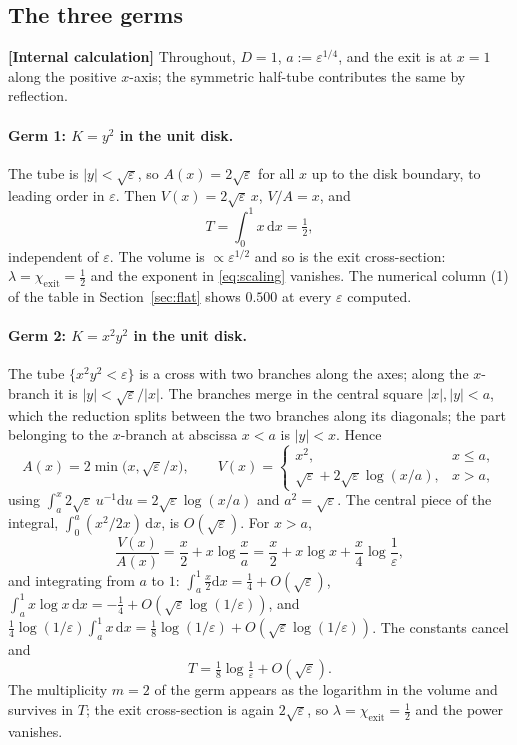 \documentclass[11pt,a4paper]{article}
\newcommand{\eps}{\varepsilon}
\newcommand{\dd}{\mathrm d}
\newcommand{\chiexit}{\chi_{\mathrm{exit}}}
\newcommand{\evl}[2]{{\small\bfseries\color{#1}[#2]}}
\newcommand{\LCalc}{\evl{ccalc}{Internal calculation}}
\begin{document}
\subsection{The three germs}
\label{app:germs}

\LCalc{} Throughout, $D=1$, $a:=\eps^{1/4}$, and the exit is at $x=1$ along
the positive $x$-axis; the symmetric half-tube contributes the same by
reflection.

\paragraph{Germ 1: $K=y^2$ in the unit disk.} The tube is $|y|<\sqrt\eps$,
so $A(x)=2\sqrt\eps$ for all $x$ up to the disk boundary, to leading order
in $\eps$. Then $V(x)=2\sqrt\eps\,x$, $V/A=x$, and
\begin{equation}
T=\int_0^1x\,\dd x=\tfrac12,
\end{equation}
independent of $\eps$. The volume is $\propto\eps^{1/2}$ and so is the exit
cross-section: $\lambda=\chiexit=\tfrac12$ and the exponent in
\eqref{eq:scaling} vanishes. The numerical column (1) of the table in
Section~\ref{sec:flat} shows $0.500$ at every $\eps$ computed.

\paragraph{Germ 2: $K=x^2y^2$ in the unit disk.} The tube
$\{x^2y^2<\eps\}$ is a cross with two branches along the axes; along the
$x$-branch it is $|y|<\sqrt\eps/|x|$. The branches merge in the central
square $|x|,|y|<a$, which the reduction splits between the two branches
along its diagonals; the part belonging to the $x$-branch at abscissa $x<a$
is $|y|<x$. Hence
\begin{equation}
A(x)=2\min\bigl(x,\sqrt\eps/x\bigr),\qquad
V(x)=\begin{cases}x^2,&x\le a,\\[2pt]
\sqrt\eps+2\sqrt\eps\log(x/a),&x>a,\end{cases}
\end{equation}
using $\int_a^x2\sqrt\eps\,u^{-1}\dd u=2\sqrt\eps\log(x/a)$ and
$a^2=\sqrt\eps$. The central piece of the integral, $\int_0^a(x^2/2x)\,\dd x$,
is $O(\sqrt\eps)$. For $x>a$,
\begin{equation}
\frac{V(x)}{A(x)}=\frac{x}{2}+x\log\frac{x}{a}
=\frac{x}{2}+x\log x+\frac{x}{4}\log\frac1\eps ,
\end{equation}
and integrating from $a$ to $1$: $\int_a^1\tfrac x2\dd x=\tfrac14+O(\sqrt\eps)$,
$\int_a^1x\log x\,\dd x=-\tfrac14+O(\sqrt\eps\log(1/\eps))$, and
$\tfrac14\log(1/\eps)\int_a^1x\,\dd x=\tfrac18\log(1/\eps)+O(\sqrt\eps\log(1/\eps))$.
The constants cancel and
\begin{equation}
T=\tfrac18\log\tfrac1\eps+O(\sqrt\eps).
\end{equation}
The multiplicity $m=2$ of the germ appears as the logarithm in the volume
and survives in $T$; the exit cross-section is again $2\sqrt\eps$, so
$\lambda=\chiexit=\tfrac12$ and the power vanishes.
\end{document}
